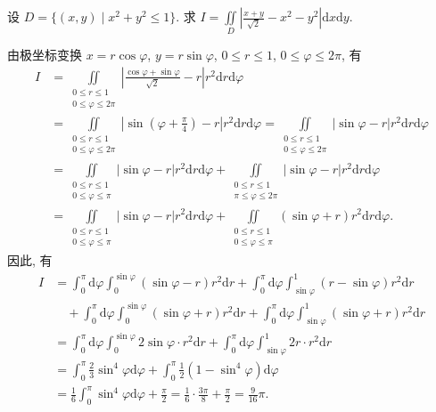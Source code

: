 \documentclass[../../main.tex]{subfiles}%
\begin{document}
\begin{example}
设 \( D = \{ (x,y) \mid x^2 + y^2 \leqslant 1 \} \). 求 \( I = \iint\limits_D \left| \frac{x + y}{\sqrt{2}} - x^2 - y^2 \right| \mathrm{d}x\mathrm{d}y \).
\end{example}
\begin{solution}
由极坐标变换 \( x = r\cos\varphi \), \( y = r\sin\varphi \), \( 0 \leqslant r \leqslant 1 \), \( 0 \leqslant \varphi \leqslant 2\pi \), 有
\begin{align*}
I &= \iint\limits_{\substack{0 \leqslant r \leqslant 1 \\ 0 \leqslant \varphi \leqslant 2\pi}} \left| \frac{\cos\varphi + \sin\varphi}{\sqrt{2}} - r \right| r^2 \mathrm{d}r\mathrm{d}\varphi
\\
&= \iint\limits_{\substack{0 \leqslant r \leqslant 1 \\ 0 \leqslant \varphi \leqslant 2\pi}} \left| \sin\left( \varphi + \frac{\pi}{4} \right) - r \right| r^2 \mathrm{d}r\mathrm{d}\varphi = \iint\limits_{\substack{0 \leqslant r \leqslant 1 \\ 0 \leqslant \varphi \leqslant 2\pi}} \left| \sin\varphi - r \right| r^2 \mathrm{d}r\mathrm{d}\varphi
\\
&= \iint\limits_{\substack{0 \leqslant r \leqslant 1 \\ 0 \leqslant \varphi \leqslant \pi}} \left| \sin\varphi - r \right| r^2 \mathrm{d}r\mathrm{d}\varphi + \iint\limits_{\substack{0 \leqslant r \leqslant 1 \\ \pi \leqslant \varphi \leqslant 2\pi}} \left| \sin\varphi - r \right| r^2 \mathrm{d}r\mathrm{d}\varphi
\\
&= \iint\limits_{\substack{0 \leqslant r \leqslant 1 \\ 0 \leqslant \varphi \leqslant \pi}} \left| \sin\varphi - r \right| r^2 \mathrm{d}r\mathrm{d}\varphi + \iint\limits_{\substack{0 \leqslant r \leqslant 1 \\ 0 \leqslant \varphi \leqslant \pi}} (\sin\varphi + r) r^2 \mathrm{d}r\mathrm{d}\varphi.
\end{align*}
因此, 有
\begin{align*}
I &= \int_0^\pi \mathrm{d}\varphi \int_0^{\sin\varphi} (\sin\varphi - r) r^2 \mathrm{d}r + \int_0^\pi \mathrm{d}\varphi \int_{\sin\varphi}^1 (r - \sin\varphi) r^2 \mathrm{d}r
\\
&\quad + \int_0^\pi \mathrm{d}\varphi \int_0^{\sin\varphi} (\sin\varphi + r) r^2 \mathrm{d}r + \int_0^\pi \mathrm{d}\varphi \int_{\sin\varphi}^1 (\sin\varphi + r) r^2 \mathrm{d}r
\\
&= \int_0^\pi \mathrm{d}\varphi \int_0^{\sin\varphi} 2\sin\varphi \cdot r^2 \mathrm{d}r + \int_0^\pi \mathrm{d}\varphi \int_{\sin\varphi}^1 2r \cdot r^2 \mathrm{d}r
\\
&= \int_0^\pi \frac{2}{3} \sin^4\varphi \mathrm{d}\varphi + \int_0^\pi \frac{1}{2}(1 - \sin^4\varphi) \mathrm{d}\varphi
\\
&= \frac{1}{6} \int_0^\pi \sin^4\varphi \mathrm{d}\varphi + \frac{\pi}{2} = \frac{1}{6} \cdot \frac{3\pi}{8} + \frac{\pi}{2} = \frac{9}{16}\pi.
\end{align*}

\end{solution}
\end{document}
